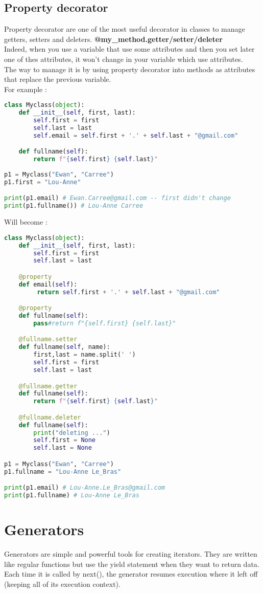\documentclass[a4paper, 12pt, titlepage]{scrartcl} %
\begin{document}
\subsection{Property decorator}
\label{subsec:Property}
Property decorator are one of the most useful decorator in classes to manage getters, setters and deleters. \textbf{@my\_method.getter/setter/deleter}\\
Indeed, when you use a variable that use some attributes and then you set later one of thes attributes, it won't change in your variable which use attributes. \\
The way to manage it is by using property decorator into methods as attributes that replace the previous variable. \\
For example :
\begin{lstlisting}[language=Python]
class Myclass(object):
	def __init__(self, first, last):
		self.first = first
		self.last = last
		self.email = self.first + '.' + self.last + "@gmail.com"

	def fullname(self):
		return f"{self.first} {self.last}"
		
p1 = Myclass("Ewan", "Carree")
p1.first = "Lou-Anne"

print(p1.email) # Ewan.Carree@gmail.com -- first didn't change
print(p1.fullname()) # Lou-Anne Carree
\end{lstlisting}
Will become :
\begin{lstlisting}[language=Python]
class Myclass(object):
	def __init__(self, first, last):
		self.first = first
		self.last = last

	@property
	def email(self):
		 return self.first + '.' + self.last + "@gmail.com"

	@property
	def fullname(self):
		pass#return f"{self.first} {self.last}"

	@fullname.setter
	def fullname(self, name):
		first,last = name.split(' ')
		self.first = first
		self.last = last

	@fullname.getter
	def fullname(self):
		return f"{self.first} {self.last}"

	@fullname.deleter
	def fullname(self):
		print("deleting ...")
		self.first = None
		self.last = None

p1 = Myclass("Ewan", "Carree")
p1.fullname = "Lou-Anne Le_Bras"

print(p1.email) # Lou-Anne.Le_Bras@gmail.com
print(p1.fullname) # Lou-Anne Le_Bras
\end{lstlisting}

\newpage
\section{Generators}
\label{sec:Generators}
Generators are simple and powerful tools for creating iterators. They are written like regular functions but use the yield statement when they want to return data. Each time it is called by next(), the generator resumes execution where it left off (keeping all of its execution context).\newline
\end{document}
